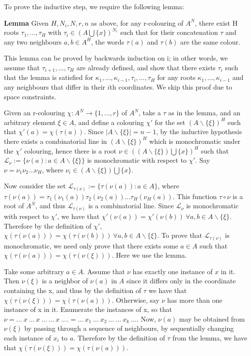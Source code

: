 \documentclass[11pt,a4paper]{article}
\begin{document}
To prove the inductive step, we require the following lemma:

\textbf{Lemma} Given $H, N_i, N, r, n$ as above, for any r-colouring of $A^N$, there exist H roots $\tau_1, ..., \tau_H$ with $\tau_i \in (A \bigcup \{x\})^{N_i}$ such that for their concatenation $\tau$ and any two neighbours $a, b \in A^H$, the words $\tau(a)$ and $\tau(b)$ are the same colour.

This lemma can be proved by backwards induction on i; in other words, we assume that $\tau_{i+1}, ..., \tau_{H}$ are already defined, and show that there exists $\tau_i$ such that the lemma is satisfied for $\kappa_1, ..., \kappa_{i-1}, \tau_i, ..., \tau_H$ for any roots $\kappa_1, ..., \kappa_{i-1}$ and any neighbours that differ in their $i$th coordinates. We skip this proof due to space constraints.

Given an r-colouring $\chi: A^N \rightarrow \{1, ..., r\}$ of $A^N$, take a $\tau$ as in the lemma, and an arbitrary element $\xi \in A$, and define a colouring $\chi'$ for the set $(A \backslash \{\xi\})^H$ such that 
$
\chi'(a) = \chi(\tau(a))
$. Since $\left| A \backslash \{\xi\} \right| = n-1$, by the inductive hypothesis there exists a combinatorial line in $(A \backslash \{\xi\})^H$ which is monochromatic under the $\chi'$ colouring, hence there is a root $\nu \in ((A \backslash \{\xi\}) \bigcup \{x\})^H$ such that $\mathcal{L}_{\nu} := \{\nu(a) : a \in A \backslash \{\xi\} \}$ is monochromatic with respect to $\chi'$. Say $\nu = \nu_1 \nu_2 ... \nu_H$, where $\nu_i \in (A \backslash \{\xi\}) \bigcup \{x\}$.

Now consider the set $\mathcal{L}_{\tau(\nu)} := \{\tau(\nu(a)) : a \in A\}$, where $\tau(\nu(a)) = \tau_1(\nu_1(a)) \tau_2(\nu_2(a)) ... \tau_H(\nu_H(a))$. This function $\tau \circ \nu $ is a root of $A^N$, and thus $\mathcal{L}_{\tau( \nu)}$ is a combinatorial line. Since $\mathcal{L}_{\nu}$ is monochromatic with respect to $\chi'$, we have that $\chi'(\nu(a)) = \chi'(\nu(b))\  \forall a, b \in A \backslash \{\xi\}$. Therefore by the definition of $\chi'$, $\chi(\tau(\nu(a))) = \chi(\tau(\nu(b))) \ \forall a, b \in A \backslash \{\xi\}$.
To prove that $\mathcal{L}_{\tau(\nu)}$ is monochromatic, we need only prove that there exists some $a \in A$ such that $\chi(\tau(\nu(a))) = \chi(\tau(\nu(\xi)))$. Here we use the lemma.

Take some arbitrary $a \in A$. Assume that $\nu$ has exactly one instance of $x$ in it. Then $\nu(\xi)$ is a neighbor of $\nu(a)$ in $A$ since it differs only in the coordinate containing the x, and thus by the definition of $\tau$ we have that $\chi(\tau(\nu(\xi))) =  \chi(\tau(\nu(a)))$.
Otherwise, say $\nu$ has more than one instance of x in it. Enumerate the instances of x, so that $\nu = ...\ x\ ...\ x\ ...\ ...\ x\ .... = ...\ x_1\ ...\ x_2\ ...\ ...\ x_k\ ...$. Now, $\nu(a)$ may be obtained from $\nu(\xi)$ by passing through a sequence of neighbours, by sequentially changing each instance of $x_i$ to $a$. Therefore by the definition of $\tau$ from the lemma, we have that $\chi(\tau(\nu(\xi))) =  \chi(\tau(\nu(a)))$.
\end{document}
